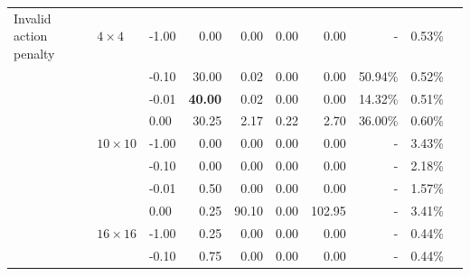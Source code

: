 \documentclass[letterpaper]{article}
\begin{document}
\begin{table}[tb]
\begin{small}
\begin{tabular}{lllrrrrrll}
\midrule
Invalid action penalty & $4\times4$ & -1.00 &                   0.00 &                           0.00 &                                0.00 &                                0.00 &                - &                 0.53\% \\
                             &       & -0.10 &                  30.00 &                           0.02 &                                0.00 &                                0.00 &                 50.94\% &                 0.52\% \\
                             &       & -0.01 &                  \textbf{40.00} &                           0.02 &                                0.00 &                                0.00 &                 14.32\% &                 0.51\% \\
                             &       &  0.00 &                  30.25 &                           2.17 &                                0.22 &                                2.70 &                 36.00\% &                 0.60\% \\
                             & $10\times10$ & -1.00 &                   0.00 &                           0.00 &                                0.00 &                                0.00 &                - &                 3.43\% \\
                             &       & -0.10 &                   0.00 &                           0.00 &                                0.00 &                                0.00 &                - &                 2.18\% \\
                             &       & -0.01 &                   0.50 &                           0.00 &                                0.00 &                                0.00 &                - &                 1.57\% \\
                             &       &  0.00 &                   0.25 &                          90.10 &                                0.00 &                              102.95 &                - &                 3.41\% \\
                             & $16\times16$ & -1.00 &                   0.25 &                           0.00 &                                0.00 &                                0.00 &                - &                 0.44\% \\
                             &       & -0.10 &                   0.75 &                           0.00 &                                0.00 &                                0.00 &                - &                 0.44\% \\

\end{tabular}
\end{small}
\end{table}
\end{document}
